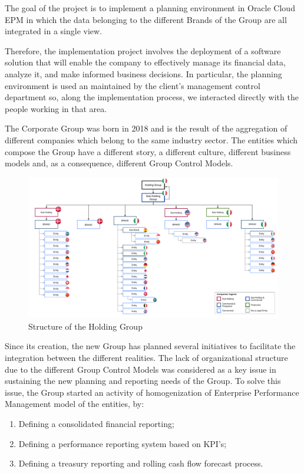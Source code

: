 \documentclass[12pt,a4paper,openright,twoside]{book}
\begin{document}
The goal of the project is to implement a planning environment in Oracle Cloud EPM in which the data belonging to the different Brands of the Group are all integrated in a single view.

Therefore, the implementation project involves the deployment of a software solution that will enable the company to effectively manage its financial data, analyze it, and make informed business decisions.
%
In particular, the planning environment is used an maintained by the client's management control department so, along the implementation process, we interacted directly with the people working in that area.

The Corporate Group was born in 2018 and is the result of the aggregation of different companies which belong to the same industry sector.
%
The entities which compose the Group have a different story, a different culture, different business models and, as a consequence, different Group Control Models.

\begin{figure}[htbp]
	\centering
	\includegraphics[width=\linewidth]{figures/structure.pdf}
	\caption{Structure of the Holding Group}
	\label{fig:structure}
\end{figure}

Since its creation, the new Group has planned several initiatives to facilitate the integration between the different realities.
%
The lack of organizational structure due to the different Group Control Models was considered as a key issue in sustaining the new planning and reporting needs of the Group.
%
To solve this issue, the Group started an activity of  homogenization of Enterprise Performance Management model of the entities, by:

\begin{enumerate}
    \item Defining a consolidated financial reporting;
    \item Defining a performance reporting system based on KPI’s;
    \item Defining a treasury reporting and rolling cash flow forecast process.
\end{enumerate}
\end{document}
